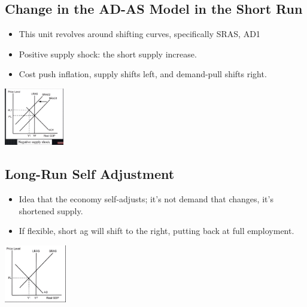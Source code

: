 \documentclass[8pt]{beamer}
\begin{document}
  \begin{frame}
	\section{Change in the AD-AS Model in the Short Run}
	\begin{itemize}
		\item This unit revolves around shifting curves, specifically SRAS, AD1
		\item Positive supply shock: the short supply increase.
		\item Cost push inflation, supply shifts left, and demand-pull shifts right.
	\end{itemize}
	\includegraphics[height=2.5cm]{2021-10-12-12-47-38.png}
  \end{frame}
  \begin{frame}
	\section{Long-Run Self Adjustment}
	\begin{itemize}
		\item Idea that the economy self-adjusts; it's not demand that changes, it's shortened supply.
		\item If flexible, short ag will shift to the right, putting back at full employment.
	\end{itemize}
	\includegraphics[height=2.5cm]{2021-10-12-12-49-20.png}
  \end{frame}
\end{document}
